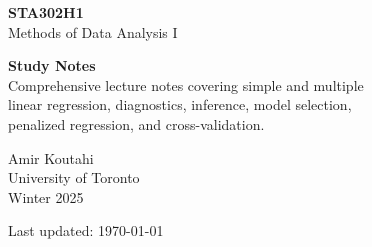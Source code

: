 \documentclass[11pt,a4paper]{article}
\begin{document}
\begin{titlepage}
\centering
\vspace*{2cm}

{\Huge\bfseries\color{defblue} STA302H1}\\[0.5cm]
{\LARGE Methods of Data Analysis I}\\[1.5cm]

\begin{tcolorbox}[
    colback=defblue!5,
    colframe=defblue!60!black,
    width=0.7\textwidth,
    arc=4pt,
    boxrule=1pt,
    halign=center
]
{\Large\bfseries Study Notes}\\[0.3cm]
{\normalsize Comprehensive lecture notes covering simple and multiple\\
linear regression, diagnostics, inference, model selection,\\
penalized regression, and cross-validation.}
\end{tcolorbox}

\vspace{2cm}

{\Large Amir Koutahi}\\[0.5cm]
{\large University of Toronto}\\[0.3cm]
{\large Winter 2025}

\vfill
{\small Last updated: \today}
\end{titlepage}

\newpage
\tableofcontents
\newpage













\end{document}
